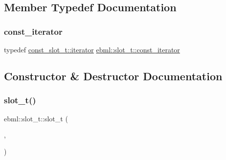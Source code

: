 \subsection{Member Typedef Documentation}
\mbox{\label{classebml_1_1slot__t_a035ab426d9062fc23e67d2b89f67ee84}} 
\subsubsection{\texorpdfstring{const\+\_\+iterator}{const\_iterator}}
{\footnotesize\ttfamily typedef \mbox{\hyperlink{classebml_1_1const__slot__t_1_1iterator}{const\+\_\+slot\+\_\+t\+::iterator}} \mbox{\hyperlink{classebml_1_1slot__t_a035ab426d9062fc23e67d2b89f67ee84}{ebml\+::slot\+\_\+t\+::const\+\_\+iterator}}}



\subsection{Constructor \& Destructor Documentation}
\mbox{\label{classebml_1_1slot__t_a9e43770cb5bc36f0cdbd1a9942d9844e}} 
\subsubsection{\texorpdfstring{slot\+\_\+t()}{slot\_t()}\hspace{0.1cm}{\footnotesize\ttfamily [1/3]}}
{\footnotesize\ttfamily ebml\+::slot\+\_\+t\+::slot\+\_\+t (\begin{DoxyParamCaption}\item[{const \mbox{\hyperlink{namespaceebml_adad533b7705a16bb360fe56380c5e7be}{ebml\+Element\+\_\+sp}} \&}]{,  }\item[{\+\_\+slot\+\_\+t \&}]{ }\end{DoxyParamCaption})\hspace{0.3cm}{\ttfamily [protected]}}

\mbox{\label{classebml_1_1slot__t_a9eafcb1c7713718640339c65db36397d}} 
